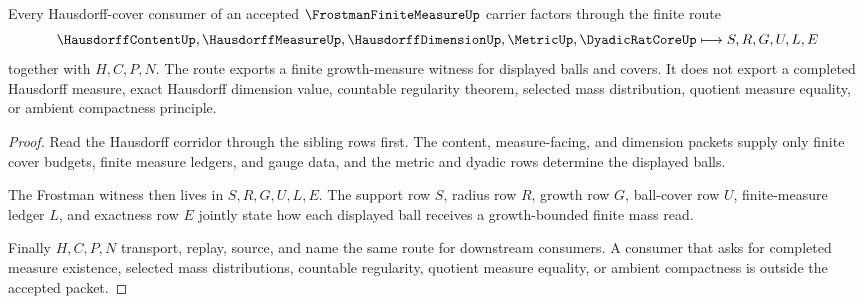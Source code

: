 \begin{theorem}
\label{thm:frostman-finite-measure-cover-growth-route}
Every Hausdorff-cover consumer of an accepted $\FrostmanFiniteMeasureUp$ carrier factors through the finite route
$$
\HausdorffContentUp,\HausdorffMeasureUp,\HausdorffDimensionUp,\MetricUp,\DyadicRatCoreUp
\longmapsto
S,R,G,U,L,E
$$
together with $H,C,P,N$. The route exports a finite growth-measure witness for displayed balls and covers. It does not export a completed Hausdorff measure, exact Hausdorff dimension value, countable regularity theorem, selected mass distribution, quotient measure equality, or ambient compactness principle.
\end{theorem}
\begin{proof}
Read the Hausdorff corridor through the sibling rows first. The content, measure-facing, and dimension packets supply only finite cover budgets, finite measure ledgers, and gauge data, and the metric and dyadic rows determine the displayed balls.

The Frostman witness then lives in $S,R,G,U,L,E$. The support row $S$, radius row $R$, growth row $G$, ball-cover row $U$, finite-measure ledger $L$, and exactness row $E$ jointly state how each displayed ball receives a growth-bounded finite mass read.

Finally $H,C,P,N$ transport, replay, source, and name the same route for downstream consumers. A consumer that asks for completed measure existence, selected mass distributions, countable regularity, quotient measure equality, or ambient compactness is outside the accepted packet.
\end{proof}




